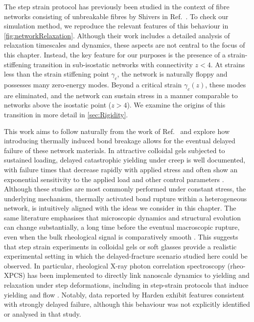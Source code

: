 \documentclass[asymmetricmargins]{library/duthesis}%
\begin{document}
The step strain protocol has previously been studied in the context of fibre networks consisting of unbreakable fibres by Shivers \etal in Ref.~\cite{shivers_strain-controlled_2023}. To check our simulation method, we reproduce the relevant features of this behaviour in \cref{fig:networkRelaxation}. Although their work includes a detailed analysis of relaxation timescales and dynamics, these aspects are not central to the focus of this chapter. Instead, the key feature for our purposes is the presence of a strain-stiffening transition in sub-isostatic networks with connectivity $z<4$. At strains less than the strain stiffening point $\gamma_c$, the network is naturally floppy and possesses many zero-energy modes. Beyond a critical strain $\gamma_c(z)$, these modes are eliminated, and the network can sustain stress in a manner comparable to networks above the isostatic point ($z>4$). We examine the origins of this transition in more detail in \cref{sec:Rigidity}.

This work aims to follow naturally from the work of Ref.~\cite{lockwood_ultradelayed_2025} and explore how introducing thermally induced bond breakage allows for the eventual delayed failure of these network materials. In attractive colloidal gels subjected to sustained loading, delayed catastrophic yielding under creep is well documented, with failure times that decrease rapidly with applied stress and often show an exponential sensitivity to the applied load and other control parameters \cite{sprakel_stress_2011,blindstrom_structures_2012,Landrum2016,Brenner2013}. Although these studies are most commonly performed under constant stress, the underlying mechanism, thermally activated bond rupture within a heterogeneous network, is intuitively aligned with the ideas we consider in this chapter. The same literature emphasises that microscopic dynamics and structural evolution can change substantially, a long time before the eventual macroscopic rupture, even when the bulk rheological signal is comparatively smooth \cite{blindstrom_structures_2012}. This suggests that step strain experiments in colloidal gels or soft glasses provide a realistic experimental setting in which the delayed-fracture scenario studied here could be observed. In particular, rheological X-ray photon correlation spectroscopy (rheo-XPCS) \cite{Leheny2015} has been implemented to directly link nanoscale dynamics to yielding and relaxation under step deformations, including in step-strain protocols that induce yielding and flow \cite{Chen2020,Bellour2003}. Notably, data reported by Harden \etal \cite{Chen2020} exhibit features consistent with strongly delayed failure, although this behaviour was not explicitly identified or analysed in that study.
\end{document}
